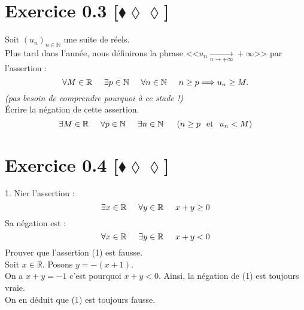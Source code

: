 \documentclass[10pt]{article}
\begin{document}
\section*{Exercice 0.3 [$\blacklozenge\lozenge\lozenge$]}
\begin{tcolorbox}[enhanced, width=6in, center, size=fbox, fontupper=\large, drop shadow southwest]
    Soit $(u_n)_{n\in\mathbb{N}}$ une suite de réels.\\
    Plus tard dans l'année, nous définirons la phrase <<$u_n\underset{n\rightarrow+\infty}{\longrightarrow}+\infty$>> par l'assertion :
    \begin{equation*}
        \forall M\in\mathbb{R}\hspace{0.5cm}\exists p\in\mathbb{N}\hspace{0.5cm} \forall{n}\in\mathbb{N}\hspace{0.5cm}n\geq p\Longrightarrow u_n\geq M.
    \end{equation*}
    \emph{(pas besoin de comprendre pourquoi à ce stade !)}\\
    Écrire la négation de cette assertion.
    \begin{equation*}
        \exists{M\in\mathbb{R}}\hspace{0.5cm}\forall{p\in\mathbb{N}}\hspace{0.5cm}\exists{n\in\mathbb{N}}\hspace{0.5cm}\left(n\geq{p}\hspace{0.25cm}\text{et}\hspace{0.25cm}u_n<M\right)
    \end{equation*}
\end{tcolorbox}

\section*{Exercice 0.4 [$\blacklozenge\lozenge\lozenge$]}
\begin{tcolorbox}[enhanced, width=6in, center, size=fbox, fontupper=\large, drop shadow southwest]
    1. Nier l'assertion :
    \begin{equation}
        \exists{x\in\mathbb{R}}\hspace{0.5cm}\forall{y\in\mathbb{R}}\hspace{0.5cm}x+y\geq0
    \end{equation}
    Sa négation est :
    \begin{equation*}
        \forall{x\in\mathbb{R}}\hspace{0.5cm}\exists{y\in\mathbb{R}}\hspace{0.5cm}x+y<0
    \end{equation*}
    Prouver que l'assertion (1) est fausse.\\
    Soit $x\in\mathbb{R}$. Posons $y=-(x+1)$.\\
    On a $x+y=-1$ c'est pourquoi $x+y<0$. Ainsi, la négation de (1) est toujours vraie.\\
    On en déduit que (1) est toujours fausse.
\end{tcolorbox}
\end{document}
